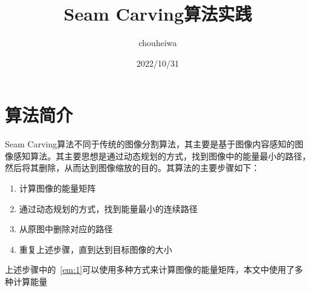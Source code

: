 \documentclass[UTF8]{article} %
\title{Seam Carving算法实践}
\author{chouheiwa}
\date{2022/10/31}
\begin{document}
\section{算法简介}
    Seam Carving算法不同于传统的图像分割算法，其主要是基于图像内容感知的图像感知算法。其主要思想是通过动态规划的方式，找到图像中的能量最小的路径，然后将其删除，从而达到图像缩放的目的。其算法的主要步骤如下：
    \begin{enumerate}
        \item 计算图像的能量矩阵 \label{em:1}
        \item 通过动态规划的方式，找到能量最小的连续路径 \label{em:2}
        \item 从原图中删除对应的路径
        \item 重复上述步骤，直到达到目标图像的大小
    \end{enumerate}

    上述步骤中的~\ref{em:1}可以使用多种方式来计算图像的能量矩阵，本文中使用了多种计算能量
\end{document}
